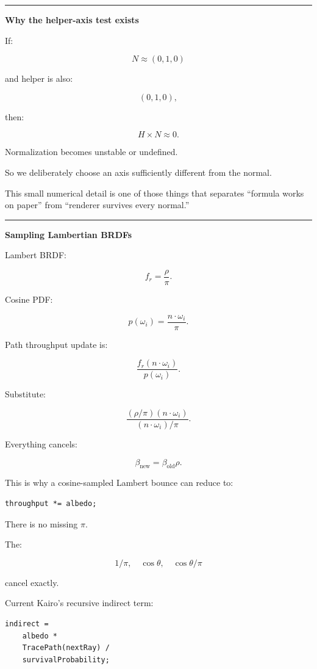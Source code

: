 \begin{center}\rule{0.5\linewidth}{0.5pt}\end{center}

\textbf{Why the helper-axis test exists}

If:

\[
N\approx(0,1,0)
\]

and helper is also:

\[
(0,1,0),
\]

then:

\[
H\times N\approx0.
\]

Normalization becomes unstable or undefined.

So we deliberately choose an axis sufficiently different from the normal.

This small numerical detail is one of those things that separates ``formula works on paper'' from ``renderer survives every normal.''

\begin{center}\rule{0.5\linewidth}{0.5pt}\end{center}

\textbf{Sampling Lambertian BRDFs}

Lambert BRDF:

\[
f_r=\frac{\rho}{\pi}.
\]

Cosine PDF:

\[
p(\omega_i)
=
\frac{n\cdot\omega_i}{\pi}.
\]

Path throughput update is:

\[
\frac{
f_r
(n\cdot\omega_i)
}{
p(\omega_i)
}.
\]

Substitute:

\[
\frac{
(\rho/\pi)
(n\cdot\omega_i)
}{
(n\cdot\omega_i)/\pi
}.
\]

Everything cancels:

\[
\boxed{
\beta_{\text{new}}
=
\beta_{\text{old}}\rho.
}
\]

This is why a cosine-sampled Lambert bounce can reduce to:

\begin{verbatim}
throughput *= albedo;
\end{verbatim}

There is no missing \(\pi\).

The:

\[
1/\pi,
\quad
\cos\theta,
\quad
\cos\theta/\pi
\]

cancel exactly.

Current Kairo's recursive indirect term:

\begin{verbatim}
indirect =
    albedo *
    TracePath(nextRay) /
    survivalProbability;
\end{verbatim}

